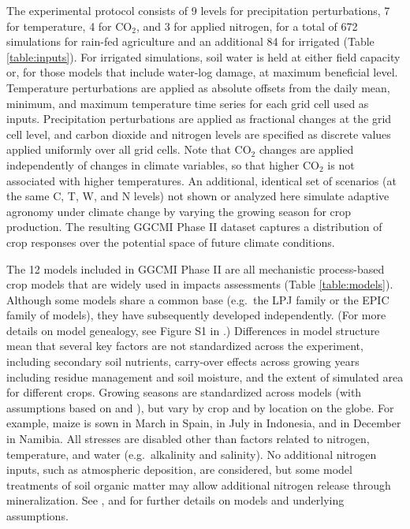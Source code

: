\documentclass[preprint, 5p, times, twocolumn]{elsarticle}
\begin{document}
\vspace{-0.05in}
The experimental protocol consists of 9 levels for precipitation perturbations, 7 for temperature, 4 for CO$_2$, and 3 for applied nitrogen, for a total of 672 simulations for rain-fed agriculture and an additional 84 for irrigated (Table \ref{table:inputs}). For irrigated simulations, soil water is held at either field capacity or, for those models that include water-log damage, at maximum beneficial level. Temperature perturbations are applied as absolute offsets from the daily mean, minimum, and maximum temperature time series for each grid cell used as inputs. Precipitation perturbations are applied as fractional changes at the grid cell level, and carbon dioxide and nitrogen levels are specified as discrete values applied uniformly over all grid cells. Note that CO$_2$ changes are applied independently of changes in climate variables, so that higher CO$_2$ is not associated with higher temperatures. An additional, identical set of scenarios (at the same C, T, W, and N levels) not shown or analyzed here simulate adaptive agronomy under climate change by varying the growing season for crop production. The resulting GGCMI Phase II dataset captures a distribution of crop responses over the potential space of future climate conditions.

The 12 models included in GGCMI Phase II are all mechanistic process-based crop models that are widely used in impacts assessments (Table \ref{table:models}). Although some models share a common base (e.g.\ the LPJ family or the EPIC family of models), they have subsequently developed independently. (For more details on model genealogy, see Figure S1 in \citet{Rosenzweig2014}.) Differences in model structure mean that several key factors are not standardized across the experiment, including secondary soil nutrients, carry-over effects across growing years including residue management and soil moisture, and the extent of simulated area for different crops. Growing seasons are standardized across models (with assumptions based on \citet{Sacks2010} and \citet{Portmann2008, Portmann2010}), but vary by crop and by location on the globe. For example, maize is sown in March in Spain, in July in Indonesia, and in December in Namibia. All stresses are disabled other than factors related to nitrogen, temperature, and water (e.g.\ alkalinity and salinity). No additional nitrogen inputs, such as atmospheric deposition, are considered, but some model treatments of soil organic matter may allow additional nitrogen release through mineralization. See \citet{Rosenzweig2014}, \citet{Elliott2015} and \citet{muller_global_2017} for further details on models and underlying assumptions.
\end{document}
